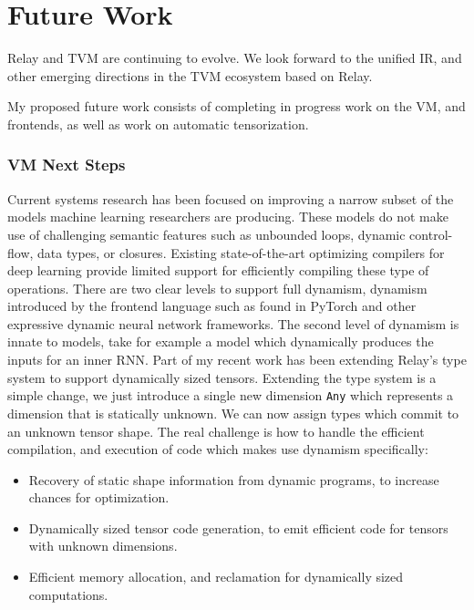 \chapter{Future Work}
\label{ch:future}

Relay and TVM are continuing to evolve.
We look forward to the unified IR,
    and other emerging directions in the TVM ecosystem based on Relay.


My proposed future work consists of completing in progress work on the VM,
and frontends, as well as work on automatic tensorization.

\subsection{VM Next Steps}

Current systems research has been focused on improving
    a narrow subset of the models machine learning
    researchers are producing.
These models do not make use of
    challenging semantic features such as unbounded
    loops, dynamic control-flow, data types, or
    closures.
Existing state-of-the-art optimizing compilers for deep learning provide
    limited support for efficiently compiling these type of operations.
There are two clear levels to support full dynamism,
    dynamism introduced by the frontend language
    such as found in PyTorch and other expressive
    dynamic neural network frameworks.
The second level of dynamism is innate to models,
    take for example a model which dynamically
    produces the inputs for an inner RNN.
Part of my recent work has been extending Relay's type system to
    support dynamically sized tensors.
Extending the type system is a simple change, we just introduce
    a single new dimension \verb|Any| which represents a dimension
    that is statically unknown.
We can now assign types which commit to an unknown tensor shape.
The real challenge is how to handle the efficient compilation,
    and execution of code which makes use dynamism
    specifically:
\begin{itemize}
    \item Recovery of static shape information from dynamic programs,
          to increase chances for optimization.
    \item Dynamically sized tensor code generation,
          to emit efficient code for tensors with
          unknown dimensions.
    \item Efficient memory allocation, and reclamation
          for dynamically sized computations.
\end{itemize}


